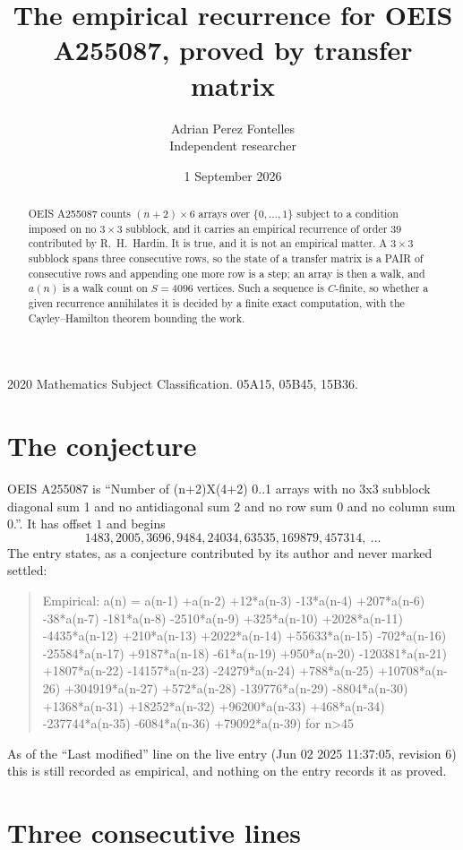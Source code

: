 \documentclass[11pt,a4paper]{article}
\title{The empirical recurrence for OEIS A255087, proved by transfer matrix}
\author{Adrian Perez Fontelles\\ \small Independent researcher}
\date{1 September 2026}
\theoremstyle{plain}
\theoremstyle{definition}
\begin{document}
\maketitle

\begin{abstract}
OEIS A255087 counts $(n+2)\times6$ arrays over $\{0,\dots,1\}$ subject to a condition imposed on
no $3\times3$ subblock, and it carries an empirical recurrence of order $39$
contributed by R.~H.~Hardin. It is true, and it is not an empirical matter. A $3\times3$
subblock spans three consecutive rows, so the state of a transfer matrix is a PAIR of
consecutive rows and appending one more row is a step; an array is then a walk, and
$a(n)$ is a walk count on $S=4096$ vertices. Such a sequence is $C$-finite, so whether a given
recurrence annihilates it is decided by a finite exact computation, with the Cayley--Hamilton
theorem bounding the work.
\end{abstract}

\noindent\small 2020 Mathematics Subject Classification. 05A15, 05B45, 15B36.\normalsize

\section{The conjecture}

OEIS A255087 is ``Number of (n+2)X(4+2) 0..1 arrays with no 3x3 subblock diagonal sum 1 and no antidiagonal sum 2 and no row sum 0 and no column sum 0.''. It has offset $1$ and begins
\[
1483, 2005, 3696, 9484, 24034, 63535, 169879, 457314,\ \dots
\]
The entry states, as a conjecture contributed by its author and never marked settled:
\begin{quote}
Empirical: a(n) = a(n-1) +a(n-2) +12*a(n-3) -13*a(n-4) +207*a(n-6) -38*a(n-7) -181*a(n-8) -2510*a(n-9) +325*a(n-10) +2028*a(n-11) -4435*a(n-12) +210*a(n-13) +2022*a(n-14) +55633*a(n-15) -702*a(n-16) -25584*a(n-17) +9187*a(n-18) -61*a(n-19) +950*a(n-20) -120381*a(n-21) +1807*a(n-22) -14157*a(n-23) -24279*a(n-24) +788*a(n-25) +10708*a(n-26) +304919*a(n-27) +572*a(n-28) -139776*a(n-29) -8804*a(n-30) +1368*a(n-31) +18252*a(n-32) +96200*a(n-33) +468*a(n-34) -237744*a(n-35) -6084*a(n-36) +79092*a(n-39) for n>45
\end{quote}
As of the ``Last modified'' line on the live entry (Jun 02 2025 11:37:05, revision 6) this is still
recorded as empirical, and nothing on the entry records it as proved.

\section{Three consecutive lines}
\end{document}
